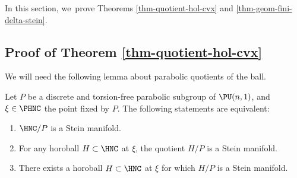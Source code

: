 In this section, we~prove Theorems \ref{thm-quotient-hol-cvx} and \ref{thm-geom-fini-delta-stein}.

\subsection{Proof of Theorem \ref{thm-quotient-hol-cvx}}

We will need the following lemma about parabolic quotients of the ball.

\begin{lemma}\label{lem-quotient-horoboule-stein}
Let $P$ be a discrete and torsion-free parabolic subgroup of $\PU(n,1)$, and $\xi\in \PHNC$ the point fixed by $P$. The following statements are equivalent:
\begin{enumerate}
\item\label{lem-quotient-horoboule-stein1} $\HNC/P$ is a Stein manifold.
\item\label{lem-quotient-horoboule-stein2} For any horoball $H\subset \HNC$ at $\xi$, the quotient $H/P$ is a Stein manifold.
\item\label{lem-quotient-horoboule-stein3} There exists a horoball $H\subset \HNC$ at $\xi$ for which $H/P$ is a Stein manifold.
\end{enumerate}
\end{lemma}

